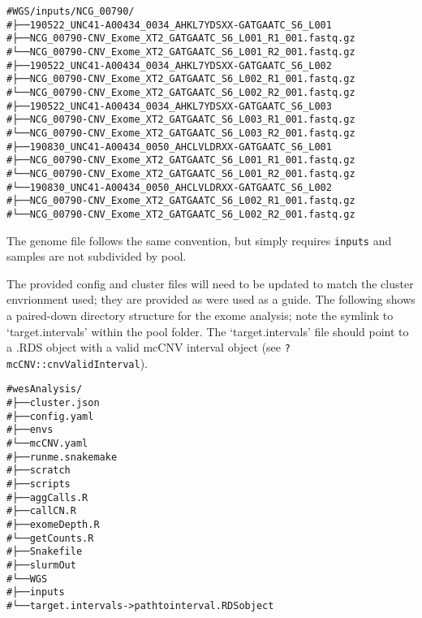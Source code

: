 \documentclass{article}\usepackage[]{graphicx}\usepackage[]{color}
\makeatletter
\newcommand{\hlcom}[1]{\textcolor[rgb]{0.588,0.588,0.588}{#1}}%
\newenvironment{kframe}{%
 \def\at@end@of@kframe{}%
 \ifinner\ifhmode%
  \def\at@end@of@kframe{\end{minipage}}%
  \begin{minipage}{\columnwidth}%
 \fi\fi%
 \def\FrameCommand##1{\hskip\@totalleftmargin \hskip-\fboxsep
 \colorbox{shadecolor}{##1}\hskip-\fboxsep
     \hskip-\linewidth \hskip-\@totalleftmargin \hskip\columnwidth}%
 \MakeFramed {\advance\hsize-\width
   \@totalleftmargin\z@ \linewidth\hsize
   \@setminipage}}%
 {\par\unskip\endMakeFramed%
 \at@end@of@kframe}
\newenvironment{knitrout}{}{} %
\makeatother
\begin{document}
\begin{knitrout}
\color{fgcolor}\begin{kframe}
\begin{alltt}
\hlcom{# WGS/inputs/NCG_00790/}
\hlcom{# ├── 190522_UNC41-A00434_0034_AHKL7YDSXX-GATGAATC_S6_L001}
\hlcom{#     ├── NCG_00790-CNV_Exome_XT2_GATGAATC_S6_L001_R1_001.fastq.gz}
\hlcom{#     └── NCG_00790-CNV_Exome_XT2_GATGAATC_S6_L001_R2_001.fastq.gz}
\hlcom{# ├── 190522_UNC41-A00434_0034_AHKL7YDSXX-GATGAATC_S6_L002}
\hlcom{#     ├── NCG_00790-CNV_Exome_XT2_GATGAATC_S6_L002_R1_001.fastq.gz}
\hlcom{#     └── NCG_00790-CNV_Exome_XT2_GATGAATC_S6_L002_R2_001.fastq.gz}
\hlcom{# ├── 190522_UNC41-A00434_0034_AHKL7YDSXX-GATGAATC_S6_L003}
\hlcom{#     ├── NCG_00790-CNV_Exome_XT2_GATGAATC_S6_L003_R1_001.fastq.gz}
\hlcom{#     └── NCG_00790-CNV_Exome_XT2_GATGAATC_S6_L003_R2_001.fastq.gz}
\hlcom{# ├── 190830_UNC41-A00434_0050_AHCLVLDRXX-GATGAATC_S6_L001}
\hlcom{#     ├── NCG_00790-CNV_Exome_XT2_GATGAATC_S6_L001_R1_001.fastq.gz}
\hlcom{#     └── NCG_00790-CNV_Exome_XT2_GATGAATC_S6_L001_R2_001.fastq.gz}
\hlcom{# └── 190830_UNC41-A00434_0050_AHCLVLDRXX-GATGAATC_S6_L002}
\hlcom{#     ├── NCG_00790-CNV_Exome_XT2_GATGAATC_S6_L002_R1_001.fastq.gz}
\hlcom{#     └── NCG_00790-CNV_Exome_XT2_GATGAATC_S6_L002_R2_001.fastq.gz}
\end{alltt}
\end{kframe}
\end{knitrout}

The genome file follows the same convention, but simply requires \texttt{inputs} and samples are not subdivided by pool.

The provided config and cluster files will need to be updated to match the cluster envrionment used; they are provided as were used as a guide.
The following shows a paired-down directory structure for the exome analysis; note the symlink to `target.intervals' within the pool folder.
The `target.intervals' file should point to a .RDS object with a valid mcCNV interval object (see \texttt{?mcCNV::cnvValidInterval}).

\begin{knitrout}
\color{fgcolor}\begin{kframe}
\begin{alltt}
\hlcom{# wesAnalysis/}
\hlcom{# ├── cluster.json}
\hlcom{# ├── config.yaml}
\hlcom{# ├── envs}
\hlcom{#     └── mcCNV.yaml}
\hlcom{# ├── runme.snakemake}
\hlcom{# ├── scratch}
\hlcom{# ├── scripts}
\hlcom{#     ├── aggCalls.R}
\hlcom{#     ├── callCN.R}
\hlcom{#     ├── exomeDepth.R}
\hlcom{#     └── getCounts.R}
\hlcom{# ├── Snakefile}
\hlcom{# ├── slurmOut}
\hlcom{# └── WGS}
\hlcom{#     ├── inputs}
\hlcom{#     └── target.intervals -> path to interval .RDS object}
\end{alltt}
\end{kframe}
\end{knitrout}
\end{document}
